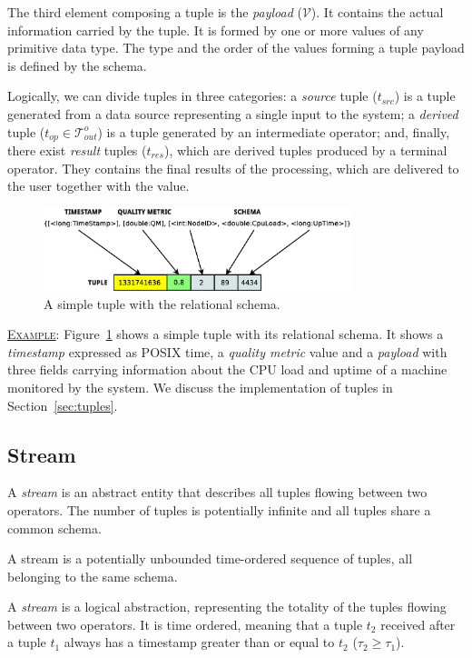 The third element composing a tuple is the \textit{payload} ($\mathcal{V}$). It contains the actual
information carried by the tuple. It is formed by one or more values of any primitive data type. 
The type and the order of the values forming a tuple payload is defined by the schema.

Logically, we can divide tuples in three categories: a \textit{source} tuple ($t_{src}$) is a tuple
generated from a data source representing a single input to the system; a \textit{derived} tuple ($t_{op}
\in \mathcal{T}_{out}^{o}$) is a tuple generated by an intermediate operator; and, finally, there exist
\textit{result} tuples ($t_{res}$), which are derived tuples produced by a terminal operator. They
contains the final results of the processing, which are delivered to the user together with the \qm
value.

\begin{figure}[t]
	\centering
	\includegraphics[width=0.8\textwidth]{img/tesi/tuple}
	\caption{A simple tuple with the relational schema.}
	\label{fig:stuple}
\end{figure}
\underline{\textsc{Example}}: Figure~\ref{fig:stuple} shows a simple tuple with its relational schema.
It shows a \emph{timestamp} expressed as POSIX time, a \emph{quality metric} value and a \emph{payload}
with three fields carrying information about the CPU load and uptime of a machine monitored by the system.
We discuss the implementation of tuples in Section~\ref{sec:tuples}.
\vspace{-10pt}
\subsection*{Stream}
A \emph{stream} is an abstract entity that describes all tuples flowing between two
operators. The number of tuples is potentially infinite and all tuples share a common schema.
\begin{definition}[Stream] {
A stream is a potentially unbounded time-ordered sequence of tuples, all belonging to the same schema.}
\end{definition}
A \textit{stream} is a logical abstraction, representing the totality of the
tuples flowing between two operators. It is time ordered, meaning that a tuple $t_2$ received after a
tuple $t_1$ always has a timestamp greater than or equal to $t_2$ (\ie $\tau_2 \geq \tau_1$).

